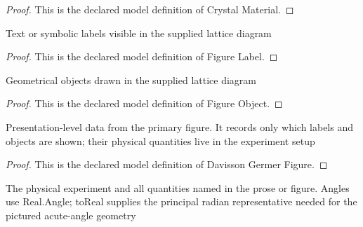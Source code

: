 \begin{proof}
  This is the declared model definition of Crystal Material.
\end{proof}
\begin{definition}
  \label{def:physics:phyx-mini-0532:phyxminiproblems-problemphyxmini0532-figurelabel}
  Text or symbolic labels visible in the supplied lattice diagram
\end{definition}
\begin{proof}
  This is the declared model definition of Figure Label.
\end{proof}
\begin{definition}
  \label{def:physics:phyx-mini-0532:phyxminiproblems-problemphyxmini0532-figureobject}
  Geometrical objects drawn in the supplied lattice diagram
\end{definition}
\begin{proof}
  This is the declared model definition of Figure Object.
\end{proof}
\begin{definition}
  \label{def:physics:phyx-mini-0532:phyxminiproblems-problemphyxmini0532-davissongermerfigure}
  Presentation-level data from the primary figure. It records only which labels and objects are shown; their physical quantities live in the experiment setup
\end{definition}
\begin{proof}
  This is the declared model definition of Davisson Germer Figure.
\end{proof}
\begin{definition}
  \label{def:physics:phyx-mini-0532:phyxminiproblems-problemphyxmini0532-electrondiffractionsetup}
  The physical experiment and all quantities named in the prose or figure. Angles use Real.Angle; toReal supplies the principal radian representative needed for the pictured acute-angle geometry
\end{definition}
